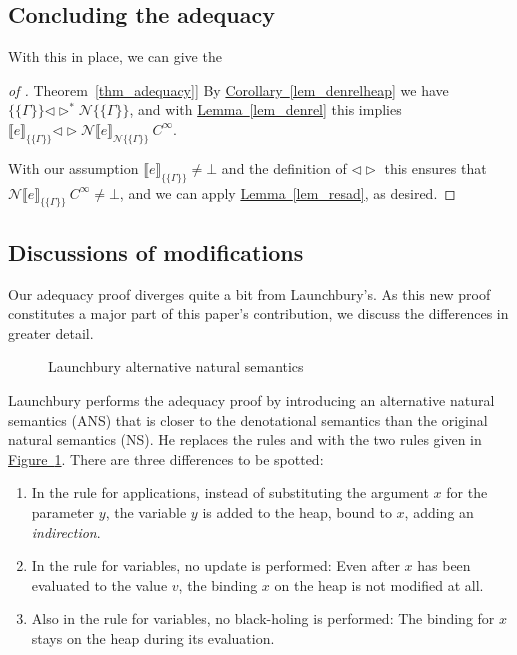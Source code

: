 \documentclass{jfp1}
\newcommand{\myref}[2]{\hyperref[#2]{#1~\ref*{#2}}}
\theoremstyle{nonumberbreak}
\newtheorem{proof}{Proof}
\newcommand{\sApp}[2]{#1\;#2}
\newcommand{\sLam}[2]{\text{\textlambda} #1.\, #2}
\newcommand{\sred}[5]{#1 : #2 \Downarrow_{#3} #4 : #5}
\newcommand{\sRule}[1]{\text{{\textsc{#1}}}}
\newcommand{\dsem}[2]{\llbracket #1 \rrbracket_{#2}}
\newcommand{\esem}[1]{\{\!\!\!\{#1\}\!\!\!\}}
\newcommand{\dsemr}[2]{\mathcal N\!\llbracket #1 \rrbracket_{#2}}
\newcommand{\esemr}[1]{\mathcal N\!\!\{\!\!\!\{#1\}\!\!\!\}}
\newcommand{\dsim}{\mathrel{\triangleleft\triangleright}}
\newcommand{\dsimheap}{\mathrel{\triangleleft\triangleright^*}}
\begin{document}
\subsection{Concluding the adequacy}

With this in place, we can give the
\begin{proof}[of \myref{Theorem}{thm_adequacy}]
By \myref{Corollary}{lem_denrelheap} we have $\esem{\Gamma}\dsimheap \esemr{\Gamma}$, and with \myref{Lemma}{lem_denrel} this implies $\dsem{e}{\esem{\Gamma}} \dsim \dsemr{e}{\esemr{\Gamma}}~C^\infty$.

With our assumption $\dsem{e}{\esem{\Gamma}} \ne \bot$ and the definition of $\dsim$ this ensures that $\dsemr{e}{\esem{\Gamma}}~C^\infty \ne \bot$, and we can apply \myref{Lemma}{lem_resad}, as desired.
\end{proof}


\subsection{Discussions of modifications}
\label{sec_modifications3}

Our adequacy proof diverges quite a bit from Launchbury's. As this new proof constitutes a major part of this paper's contribution, we discuss the differences in greater detail.

\begin{figure}
\caption{Launchbury alternative natural semantics}
\label{fig_ans}
\end{figure}

Launchbury performs the adequacy proof by introducing an alternative natural semantics (ANS) that is closer to the denotational semantics than the original natural semantics (NS). He replaces the rules \sRule{App} and \sRule{Var} with the two rules given in \myref{Figure}{fig_ans}. There are three differences to be spotted:
\begin{enumerate}
\item In the rule for applications, instead of substituting the argument $x$ for the parameter $y$, the variable $y$ is added to the heap, bound to $x$, adding an \emph{indirection}.
\item In the rule for variables, no update is performed: Even after $x$ has been evaluated to the value $v$, the binding $x$ on the heap is not modified at all.
\item Also in the rule for variables, no black-holing is performed: The binding for $x$ stays on the heap during its evaluation.
\end{enumerate}
\end{document}
